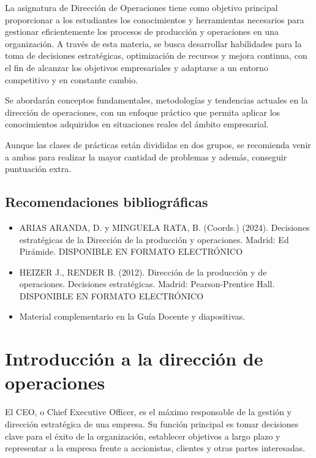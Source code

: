 \documentclass[12pt]{report} %
\providecommand{\tightlist}{%
  \setlength{\itemsep}{0pt}\setlength{\parskip}{0pt}}
\begin{document}
La asignatura de Dirección de Operaciones tiene como objetivo principal
proporcionar a los estudiantes los conocimientos y herramientas
necesarios para gestionar eficientemente los procesos de producción y
operaciones en una organización. A través de esta materia, se busca
desarrollar habilidades para la toma de decisiones estratégicas,
optimización de recursos y mejora continua, con el fin de alcanzar los
objetivos empresariales y adaptarse a un entorno competitivo y en
constante cambio.

Se abordarán conceptos fundamentales, metodologías y tendencias actuales
en la dirección de operaciones, con un enfoque práctico que permita
aplicar los conocimientos adquiridos en situaciones reales del ámbito
empresarial.

Aunque las clases de prácticas están divididas en dos grupos, se
recomienda venir a ambas para realizar la mayor cantidad de problemas y
además, conseguir puntuación extra.

\hypertarget{recomendaciones-bibliogruxe1ficas}{%
\section{Recomendaciones
bibliográficas}\label{recomendaciones-bibliogruxe1ficas}}

\begin{itemize}
\tightlist
\item
  ARIAS ARANDA, D. y MINGUELA RATA, B. (Coords.) (2024). Decisiones
  estratégicas de la Dirección de la producción y operaciones. Madrid:
  Ed Pirámide. DISPONIBLE EN FORMATO ELECTRÓNICO\\
\item
  HEIZER J., RENDER B. (2012). Dirección de la producción y de
  operaciones. Decisiones estratégicas. Madrid: Pearson-Prentice Hall.
  DISPONIBLE EN FORMATO ELECTRÓNICO\\
\item
  Material complementario en la Guía Docente y diapositivas.
\end{itemize}

\hypertarget{introducciuxf3n-a-la-direcciuxf3n-de-operaciones}{%
\chapter{Introducción a la dirección de
operaciones}\label{introducciuxf3n-a-la-direcciuxf3n-de-operaciones}}

\begin{definicion}
El CEO, o Chief Executive Officer, es el máximo responsable de la gestión y dirección estratégica de una empresa. Su función principal es tomar decisiones clave para el éxito de la organización, establecer objetivos a largo plazo y representar a la empresa frente a accionistas, clientes y otras partes interesadas.
\end{definicion}
\end{document}
